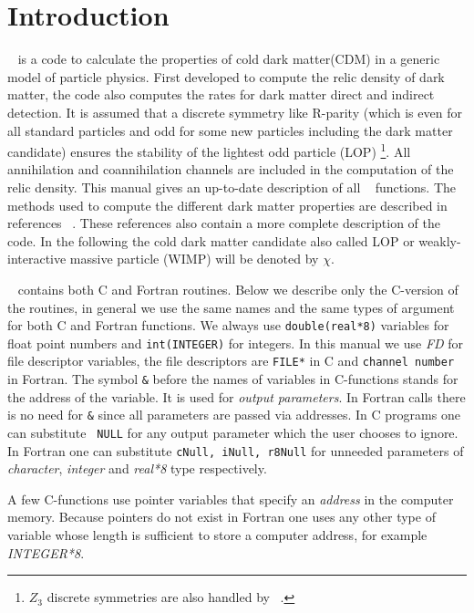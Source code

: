 \documentclass[12pt,a4paper]{article}
\begin{document}
\section{Introduction}
\micro~ is a code 
 to calculate the properties of cold dark matter(CDM)  in a generic model of particle physics.  
 First developed to compute the relic density of dark matter, 
 the code also computes the rates for dark matter direct and  indirect detection. 
 It is assumed that a discrete symmetry like R-parity (which is even for all standard particles and odd for some new particles including the dark matter candidate) ensures the stability of the lightest 
 odd particle (LOP) \footnote{$Z_3$ discrete symmetries are also handled by ~\micro.}. 
All annihilation and coannihilation channels are included in the computation of the relic density. 
This manual gives an up-to-date description of all \micro~ functions.  
The methods used to compute the different dark matter properties are described 
in references 
~\cite{Belanger:2001fz,Belanger:2004yn,Belanger:2006is,Belanger:2008sj,Belanger:2010gh,Belanger:2013oya}.
These references also contain  a more complete description of the code. In the following
the cold dark matter candidate also called LOP or weakly-interactive massive particle (WIMP)
will be denoted by $\chi$. 

\micro~ contains both C and Fortran routines. Below we describe only the
C-version of the routines,  in general we use the same  names
 and the same types of argument for both  C and Fortran functions. 
We always use \verb|double(real*8)| variables for float point numbers and 
\verb|int(INTEGER)| for integers. In this manual we use {\it FD} for  file descriptor 
variables, the file descriptors  are  \verb|FILE*| in C and {\tt channel number} in Fortran. 
The symbol \verb|&| before the names of variables in C-functions stands for 
the address of the variable. It is used for  {\it output
parameters}. In Fortran calls there is no need for \verb|&|
since  all parameters are passed via addresses. In C programs one  can substitute {\tt
NULL} for any output parameter which the user chooses to ignore. In Fortran  one
can substitute {\tt cNull, iNull, r8Null} for unneeded
parameters of  {\it character}, {\it integer}  and {\it real*8}  type respectively.  

A few C-functions use pointer variables that specify an {\it address} in 
the computer memory. Because pointers do not exist in  Fortran one uses any
other type of variable whose length is sufficient to store a computer address, for example {\it INTEGER*8}.
\end{document}

